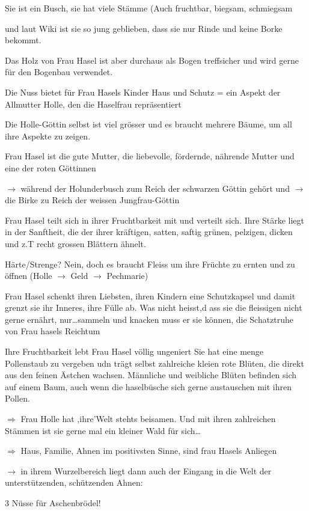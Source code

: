 \documentclass[11pt,titlepage,a5paper]{book}
\begin{document}
Sie ist ein Busch, sie hat viele Stämme (Auch fruchtbar, biegsam, schmiegsam

und laut Wiki ist sie so jung geblieben, dass sie nur Rinde und keine Borke bekommt.

Das Holz von Frau Hasel ist aber durchaus als Bogen treffsicher und wird gerne für den Bogenbau verwendet.

Die Nuss bietet für Frau Hasels Kinder Haus und Schutz
= ein Aspekt der Allmutter Holle, den die Haselfrau repräsentiert

Die Holle-Göttin selbst ist viel grösser und es braucht mehrere Bäume, um all ihre Aspekte zu zeigen.

Frau Hasel ist die gute Mutter, die liebevolle, fördernde, nährende Mutter und eine der roten Göttinnen

$\rightarrow$ während der Holunderbusch zum Reich der schwarzen Göttin gehört und
$\rightarrow$  die Birke zu Reich der weissen Jungfrau-Göttin

Frau Hasel teilt sich in ihrer Fruchtbarkeit mit und verteilt sich. Ihre Stärke liegt in der Sanftheit, die der ihrer kräftigen, satten, saftig grünen, pelzigen, dicken und z.T recht grossen Blättern ähnelt.

Härte/Strenge? Nein, doch es braucht Fleiss um ihre Früchte zu ernten und zu öffnen (Holle $\rightarrow$ Geld $\rightarrow$ Pechmarie) 

Frau Hasel schenkt ihren Liebsten, ihren Kindern eine Schutzkapsel und damit grenzt sie ihr Inneres, ihre Fülle ab. Was nicht heisst,d ass sie die fleissigen nicht gerne ernährt, nur\dots sammeln und knacken muss er sie können, die Schatztruhe von Frau hasels Reichtum

Ihre Fruchtbarkeit lebt Frau Hasel völlig ungeniert Sie hat eine menge Pollenstaub zu vergeben udn trägt selbst zahlreiche kleien rote Blüten, die direkt aus den feinen Ästchen wachsen. Männliche und weibliche Blüten befinden sich auf einem Baum, auch wenn die haselbüsche sich gerne austauschen mit ihren Pollen.

$\Rightarrow$ Frau Holle hat ,ihre'Welt stehts beisamen. Und mit ihren zahlreichen Stämmen ist sie gerne mal ein kleiner Wald für sich\dots

$\Rightarrow$ Haus, Familie, Ahnen im positivsten Sinne, sind frau Hasels Anliegen

$\rightarrow$ in ihrem Wurzelbereich liegt dann auch der Eingang in die Welt der unterstützenden, schützenden Ahnen:

3 Nüsse für Aschenbrödel!
\end{document}
